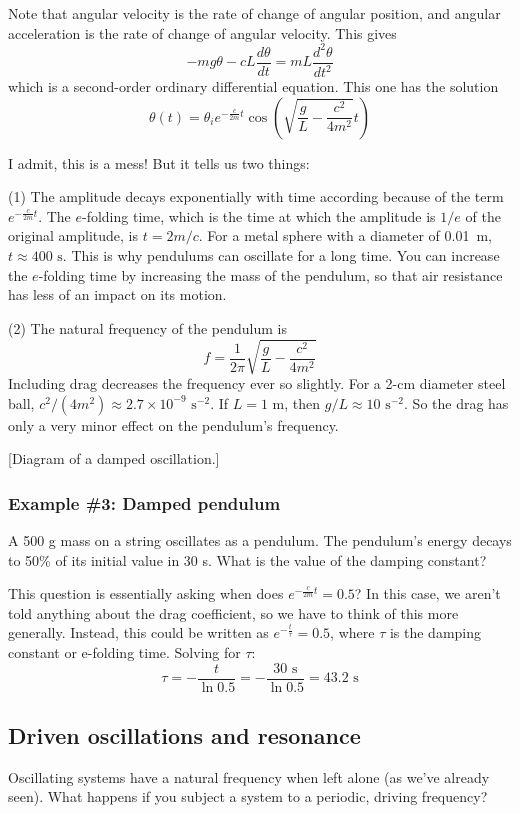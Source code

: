 Note that angular velocity is the rate of change of angular position, and angular acceleration is the rate of change of angular velocity. This gives
$$-mg\theta-cL\frac{d\theta}{dt}=mL\frac{d^2\theta}{dt^2}$$
which is a second-order ordinary differential equation. This one has the solution
$$\boxed{\theta(t)=\theta_ie^{-\frac{c}{2m}t}\cos\left(\sqrt{\frac{g}{L}-\frac{c^2}{4m^2}}t\right)}$$

I admit, this is a mess! But it tells us two things:

(1) The amplitude decays exponentially with time according because of the term $e^{-\frac{c}{2m}t}$. The $e$-folding time, which is the time at which the amplitude is $1/e$ of the original amplitude, is $t=2m/c$. For a metal sphere with a diameter of 0.01~m, $t\approx 400\mbox{ s}$. This is why pendulums can oscillate for a long time. You can increase the $e$-folding time by increasing the mass of the pendulum, so that air resistance has less of an impact on its motion.

(2) The natural frequency of the pendulum is 
$$f=\frac{1}{2\pi}\sqrt{\frac{g}{L}-\frac{c^2}{4m^2}}$$
Including drag decreases the frequency ever so slightly. For a 2-cm diameter steel ball, $c^2/(4m^2)\approx 2.7\times 10^{-9}\mbox{ s}^{-2}$. If $L=1\mbox{ m}$, then $g/L\approx 10\mbox{ s}^{-2}$. So the drag has only a very minor effect on the pendulum's frequency.

[Diagram of a damped oscillation.]\nopagebreak
\vspace{5cm}

\subsubsection{Example \#3: Damped pendulum}
A 500 g mass on a string oscillates as a pendulum. The pendulum’s energy decays to 50\% of its initial value in 30 s. What is the value of the damping constant?

This question is essentially asking when does $e^{-\frac{c}{2m}t}=0.5$? In this case, we aren't told anything about the drag coefficient, so we have to think of this more generally. Instead, this could be written as $e^{-\frac{t}{\tau}}=0.5$, where $\tau$ is the damping constant or e-folding time. Solving for $\tau$:
$$\tau = -\frac{t}{\ln 0.5}=-\frac{30\mbox{ s}}{\ln 0.5} = 43.2\mbox{ s}$$

\subsection{Driven oscillations and resonance}
Oscillating systems have a natural frequency when left alone (as we've already seen). What happens if you subject a system to a periodic, driving frequency?


